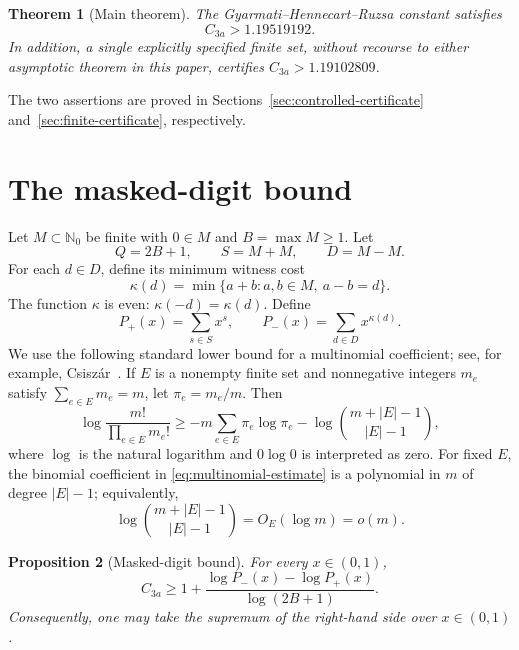 \documentclass[11pt]{article}
\newtheorem{proposition}{Proposition}
\newtheorem{theorem}[proposition]{Theorem}
\newcommand{\N}{\mathbb{N}_0}
\newcommand{\card}[1]{\lvert #1\rvert}
\begin{document}
\begin{theorem}[Main theorem]\label{thm:main}
The Gyarmati--Hennecart--Ruzsa constant satisfies
\[
 C_{3a}>1.19519192.
\]
In addition, a single explicitly specified finite set, without recourse to
either asymptotic theorem in this paper, certifies $C_{3a}>1.19102809$.
\end{theorem}
The two assertions are proved in Sections~\ref{sec:controlled-certificate}
and~\ref{sec:finite-certificate}, respectively.

\section{The masked-digit bound}
Let $M\subset\N$ be finite with $0\in M$ and
$B=\max M\ge1$. Let
\[
 Q=2B+1,
 \qquad S=M+M,
 \qquad D=M-M.
\]
For each $d\in D$, define its minimum witness cost
\begin{equation}\label{eq:kappa}
 \kappa(d)=\min\{a+b:a,b\in M,\ a-b=d\}.
\end{equation}
The function $\kappa$ is even: $\kappa(-d)=\kappa(d)$. Define
\begin{equation}\label{eq:partition-polys}
 P_+(x)=\sum_{s\in S}x^s,
 \qquad
 P_-(x)=\sum_{d\in D}x^{\kappa(d)}.
\end{equation}
We use the following standard lower bound for a multinomial coefficient;
see, for example, Csisz\'ar~\cite[Lemmas~II.1 and~II.2]{Csiszar1998}.
If $E$ is a nonempty finite set and nonnegative integers $m_e$ satisfy
$\sum_{e\in E}m_e=m$, let $\pi_e=m_e/m$. Then
\begin{equation}\label{eq:multinomial-estimate}
 \log\frac{m!}{\prod_{e\in E}m_e!}
 \ge -m\sum_{e\in E}\pi_e\log \pi_e
      -\log\binom{m+\card E-1}{\card E-1},
\end{equation}
where $\log$ is the natural logarithm and $0\log0$ is interpreted as zero.
For fixed $E$, the binomial coefficient in \eqref{eq:multinomial-estimate}
is a polynomial in $m$ of degree $\card E-1$; equivalently,
\[
 \log\binom{m+\card E-1}{\card E-1}=O_E(\log m)=o(m).
\]

\begin{proposition}[Masked-digit bound]\label{prop:masked}
For every $x\in(0,1)$,
\begin{equation}\label{eq:masked-bound}
 C_{3a}\ge
 1+\frac{\log P_-(x)-\log P_+(x)}{\log(2B+1)}.
\end{equation}
Consequently, one may take the supremum of the right-hand side over
$x\in(0,1)$.
\end{proposition}
\end{document}
